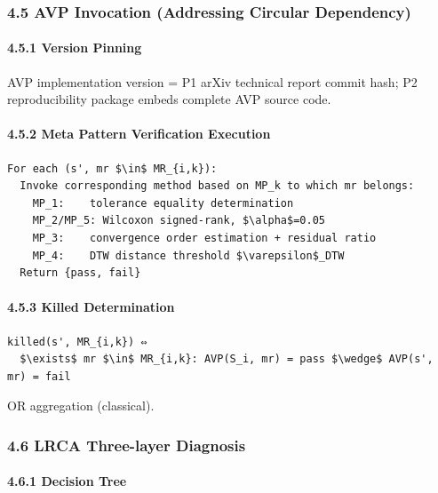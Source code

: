 \documentclass[review,12pt,authoryear]{elsarticle}
\begin{document}
\subsubsection{4.5 AVP Invocation (Addressing Circular
Dependency)}\label{avp-invocation-addressing-circular-dependency}

\paragraph{4.5.1 Version Pinning}\label{version-pinning-1}

AVP implementation version = P1 arXiv technical report commit hash; P2
reproducibility package embeds complete AVP source code.

\paragraph{4.5.2 Meta Pattern Verification
Execution}\label{meta-pattern-verification-execution}

\begin{verbatim}
For each (s', mr $\in$ MR_{i,k}):
  Invoke corresponding method based on MP_k to which mr belongs:
    MP_1:    tolerance equality determination
    MP_2/MP_5: Wilcoxon signed-rank, $\alpha$=0.05
    MP_3:    convergence order estimation + residual ratio
    MP_4:    DTW distance threshold $\varepsilon$_DTW
  Return {pass, fail}
\end{verbatim}

\paragraph{4.5.3 Killed Determination}\label{killed-determination}

\begin{verbatim}
killed(s', MR_{i,k}) ⇔
  $\exists$ mr $\in$ MR_{i,k}: AVP(S_i, mr) = pass $\wedge$ AVP(s', mr) = fail
\end{verbatim}

OR aggregation (classical).

\subsubsection{4.6 LRCA Three-layer
Diagnosis}\label{lrca-three-layer-diagnosis}

\paragraph{4.6.1 Decision Tree}\label{decision-tree-1}
\end{document}
